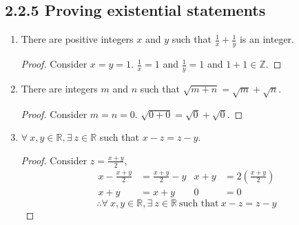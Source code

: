 \subsection*{2.2.5 Proving existential statements}
\begin{enumerate}
  \item[\bld{a.}] There are positive integers $x$ and $y$ such that $\frac{1}{x} + \frac{1}{y}$ is an integer.
    \begin{proof}
      Consider $x=y=1$. $\frac{1}{x} = 1$ and $\frac{1}{y} = 1$ and $1+1 \in \mathbb{Z}$.
    \end{proof}
  \item[\bld{c.}] There are integers $m$ and $n$ such that $\sqrt{m+n} = \sqrt{m} + \sqrt{n}$.
    \begin{proof}
      Consider $m=n=0$. $\sqrt{0+0} = \sqrt{0} + \sqrt{0}$.
    \end{proof}
  \item[\bld{h.}] $\forall~ x,y \in \mathbb{R}, \exists~ z \in \mathbb{R}$ such that $x-z=z-y$.
    \begin{proof}
      Consider $z=\frac{x+y}{2}$,
      \begin{align*}
        x - \frac{x+y}{2} & = \frac{x+y}{2} - y & x +y & = 2\left(\frac{x+y}{2}\right) \\
        x + y             & = x+y               & 0    & = 0
      \end{align*}
      \[
        \therefore \forall~ x,y \in \mathbb{R}, \exists~ z \in \mathbb{R}~\text{such that}~x-z=z-y
      \]
    \end{proof}
\end{enumerate}


